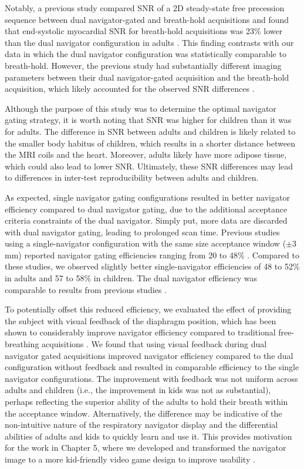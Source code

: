 	Notably, a previous study compared SNR of a 2D steady-state free precession sequence between dual navigator-gated and breath-hold acquisitions and found that end-systolic myocardial SNR for breath-hold acquisitions was 23\% lower than the dual navigator configuration in adults \cite{Peters2008}. This finding contrasts with our data in which the dual navigator configuration was statistically comparable to breath-hold. However, the previous study had substantially different imaging parameters between their dual navigator-gated acquisition and the breath-hold acquisition, which likely accounted for the observed SNR differences \cite{Peters2008}.
	
	Although the purpose of this study was to determine the optimal navigator gating strategy, it is worth noting that SNR was higher for children than it was for adults. The difference in SNR between adults and children is likely related to the smaller body habitus of children, which results in a shorter distance between the MRI coils and the heart. Moreover, adults likely have more adipose tissue, which could also lead to lower SNR. Ultimately, these SNR differences may lead to differences in inter-test reproducibility between adults and children.
	
	As expected, single navigator gating configurations resulted in better navigator efficiency compared to dual navigator gating, due to the additional acceptance criteria constraints of the dual navigator. Simply put, more data are discarded with dual navigator gating, leading to prolonged scan time. Previous studies using a single-navigator configuration with the same size acceptance window ($\pm$3 mm) reported navigator gating efficiencies ranging from 20 to 48\% \cite{Zhong2010a,Feuerlein2009,Abd-Elmoniem2011}. Compared to these studies, we observed slightly better single-navigator efficiencies of 48 to 52\% in adults and 57 to 58\% in children. The dual navigator efficiency was comparable to results from previous studies \cite{Peters2008}.
	
	To potentially offset this reduced efficiency, we evaluated the effect of providing the subject with visual feedback of the diaphragm position, which has been shown to considerably improve navigator efficiency compared to traditional free-breathing acquisitions \cite{Feuerlein2009}. We found that using visual feedback during dual navigator gated acquisitions improved navigator efficiency compared to the dual configuration without feedback and resulted in comparable efficiency to the single navigator configurations. The improvement with feedback was not uniform across adults and children (i.e., the improvement in kids was not as substantial), perhaps reflecting the superior ability of the adults to hold their breath within the acceptance window. Alternatively, the difference may be indicative of the non-intuitive nature of the respiratory navigator display and the differential abilities of adults and kids to quickly learn and use it. This provides motivation for the work in Chapter 5, where we developed and transformed the navigator image to a more kid-friendly video game design to improve usability \cite{Hamlet2016a}.
	
